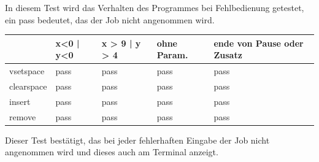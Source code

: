 In diesem Test wird das Verhalten des Programmes bei Fehlbedienung getestet, ein pass bedeutet, das der Job nicht angenommen wird.

\begin{tabular}{|l|l|l|l|l|}
\hline
         	&  x<0 | y<0 & x > 9 | y > 4 & ohne Param.& ende von Pause oder Zusatz\\
\hline
vsetspace & pass & pass & pass & pass \\
\hline
clearspace & pass & pass & pass & pass \\
\hline
insert & pass & pass & pass & pass \\
\hline
remove & pass & pass & pass & pass \\
\hline
\end{tabular}

Dieser Test bestätigt, das bei jeder fehlerhaften Eingabe der Job nicht angenommen wird und dieses auch am Terminal anzeigt.




